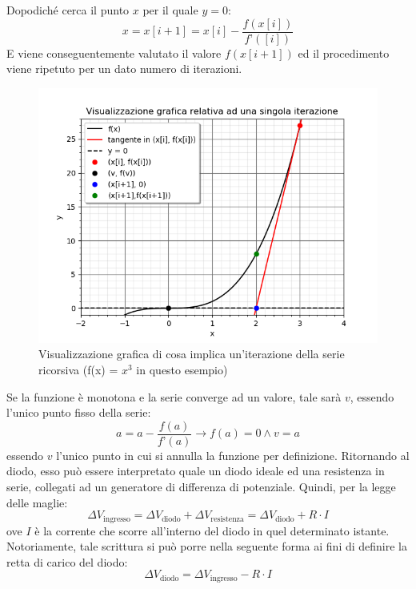\documentclass{article}[a4paper, oneside, 11pt]
\begin{document}
 Dopodiché cerca il punto $x$ per il quale $y = 0$:
\begin{equation}
x = x[i+1] = x[i] - \frac{f(x[i])}{f’([i])}
\end{equation}
E viene conseguentemente valutato il valore $f(x[i+1])$ ed il procedimento viene 
ripetuto per un dato numero di iterazioni. 
\begin{figure}[!htbp]
	\centering 
 		\includegraphics[scale=0.75]{./Figura1_appendiceB.png}
	\caption{Visualizzazione grafica di cosa implica un’iterazione della 
serie ricorsiva (f(x) = $x^3$ in questo esempio)}
\end{figure}
Se la funzione è monotona e la serie converge ad un valore, tale sarà $v$, 
essendo l’unico punto fisso della serie:
\begin{equation}
 {a = a -  {\frac{f(a)}{f{’}(a)}}}\to{{f(a) = 0}\land{v = a}}
\end{equation}
essendo $v$ l’unico punto in cui si annulla la funzione per definizione.
Ritornando al diodo, esso può essere interpretato quale un diodo ideale ed una 
resistenza in serie, collegati ad un generatore di differenza di potenziale. 
Quindi, per la legge delle maglie:
\begin{equation}
\Delta V_{\text{ingresso}} = \Delta V_{\text{diodo}} + \Delta 
V_{\text{resistenza}} = \Delta V_{\text{diodo}} + R \cdot I
\end{equation}
ove $I$ è la corrente che scorre all’interno del diodo in quel determinato 
istante. Notoriamente, tale scrittura si può porre nella seguente forma ai 
fini di definire la retta di carico del diodo:
\begin{equation}
\Delta V_{\text{diodo}} = \Delta V_{\text{ingresso}} - R \cdot I
\end{equation}
\end{document}
